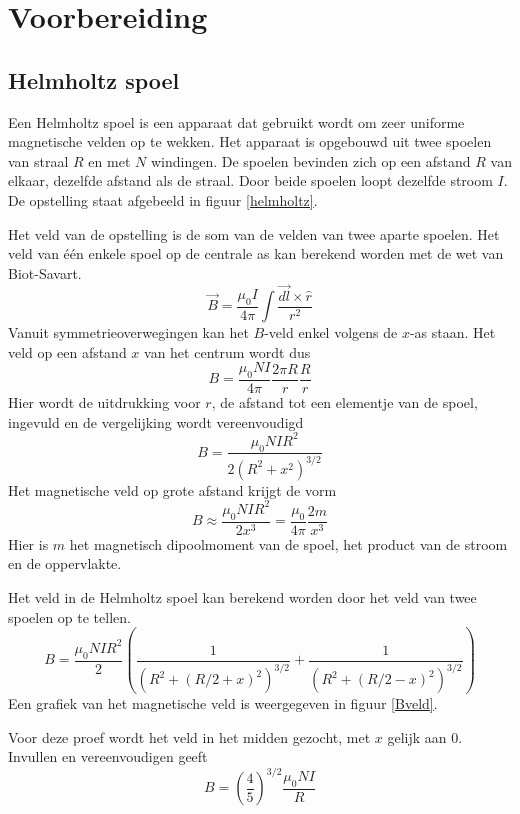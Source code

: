 \section{Voorbereiding}

\subsection{Helmholtz spoel}

Een Helmholtz spoel is een apparaat dat gebruikt wordt om zeer uniforme 
magnetische velden op te wekken. Het apparaat is opgebouwd uit twee spoelen van 
straal $R$ en met $N$ windingen. De spoelen bevinden zich op een afstand $R$ 
van elkaar,
dezelfde afstand als de straal. Door beide spoelen loopt dezelfde stroom $I$.  
De opstelling staat afgebeeld in figuur \ref{helmholtz}.


Het veld van de opstelling is de som van de velden van twee aparte spoelen. Het 
veld van \'e\'en enkele spoel op de centrale as kan berekend worden met de wet 
van Biot-Savart.
$$
\vec{B} = \frac{\mu_0 I}{4 \pi} \int \frac{\vec{dl} \times \hat{r}}{r^2}
$$
Vanuit symmetrieoverwegingen kan het $B$-veld enkel volgens de $x$-as staan.  
Het veld op een afstand $x$ van het centrum wordt dus
$$
B = \frac{\mu_0 NI}{4 \pi} \frac{2 \pi R}{r} \frac{R}{r}
$$
Hier wordt de uitdrukking voor $r$, de afstand tot een elementje van de spoel, 
ingevuld en de vergelijking wordt vereenvoudigd
$$
B = \frac{\mu_0 NI R^2}{2(R^2+x^2)^{3/2}}
$$
Het magnetische veld op grote afstand krijgt de vorm
$$
B \approx \frac{\mu_0 NI R^2}{2x^3} = \frac{\mu_0}{4 \pi}\frac{2m}{x^3}
$$
Hier is $m$ het magnetisch dipoolmoment van de spoel, het product van de stroom 
en de oppervlakte.

Het veld in de Helmholtz spoel kan berekend worden door het veld van twee 
spoelen op te tellen.
$$
B = \frac{\mu_0 NI R^2}{2}\left( \frac{1}{(R^2+(R/2+x)^2)^{3/2}} + 
\frac{1}{(R^2+(R/2-x)^2)^{3/2}} \right)
$$
Een grafiek van het magnetische veld is weergegeven in figuur \ref{Bveld}.

Voor deze proef wordt het veld in het midden gezocht, met $x$ gelijk aan $0$.
Invullen en vereenvoudigen geeft
\begin{equation}
\label{Helmholtz-eq}
B = \left(\frac{4}{5}\right)^{3/2} \frac{\mu_0 NI}{R}
\end{equation}


